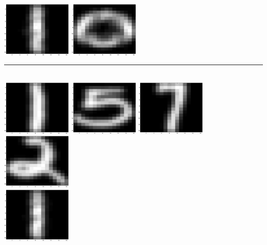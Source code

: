 \documentclass{article}
\begin{document}
\includegraphics[width=0.25\textwidth]{reconst3.eps}\hspace{0.03\textwidth}%
\includegraphics[width=0.25\textwidth]{reconst4.eps}\\[1em]
\rule{1.09\textwidth}{0.4pt}\\[1em]
\includegraphics[width=0.25\textwidth]{digits5.eps}\hspace{0.03\textwidth}%
\includegraphics[width=0.25\textwidth]{digits6.eps}\hspace{0.03\textwidth}%
\includegraphics[width=0.25\textwidth]{digits7.eps}\hspace{0.03\textwidth}%
\includegraphics[width=0.25\textwidth]{digits8.eps}\\[1em]
\includegraphics[width=0.25\textwidth]{reconst5.eps}\hspace{0.03\textwidth}%
\end{document}
